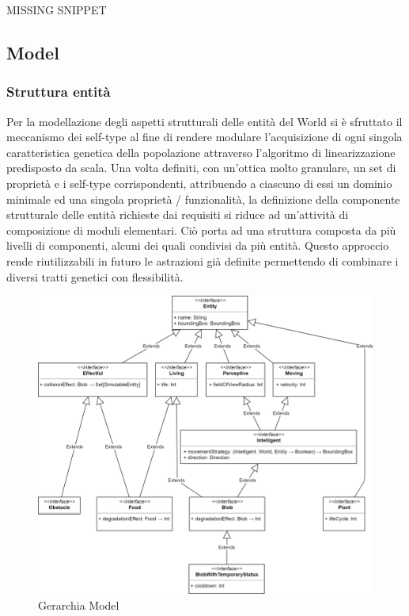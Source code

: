 MISSING SNIPPET

\subsection{Model}

\subsubsection{Struttura entità}
Per la modellazione degli aspetti strutturali delle entità del World si è sfruttato il meccanismo dei self-type al fine di rendere modulare l’acquisizione di ogni singola caratteristica genetica della popolazione attraverso l’algoritmo di linearizzazione predisposto da scala. Una volta definiti, con un’ottica molto granulare, un set di proprietà e i self-type corrispondenti, attribuendo a ciascuno di essi un dominio minimale ed una singola proprietà / funzionalità, la definizione della componente strutturale delle entità richieste dai requisiti si riduce ad un’attività di composizione di moduli elementari. Ciò porta ad una struttura composta da più livelli di componenti, alcuni dei quali condivisi da più entità. Questo approccio rende riutilizzabili in futuro le astrazioni già definite permettendo di combinare i diversi tratti genetici con flessibilità.

\begin{figure}[h!]
\centering
\includegraphics[width=\textwidth, scale=0.44]{img/ModelHierarchy.png}
\caption{Gerarchia Model}
\label{fig:modelhierarchy}
\end{figure}

